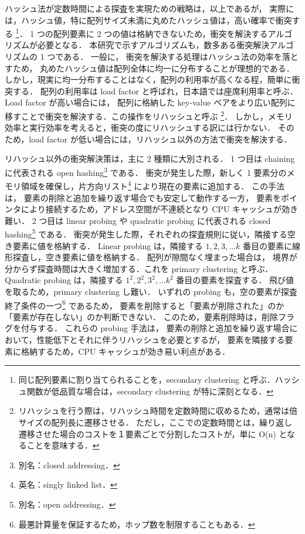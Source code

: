 ハッシュ法が定数時間による探査を実現ための戦略は，以上であるが，
実際には，ハッシュ値，特に配列サイズ未満に丸めたハッシュ値は，高い確率で衝突する
\footnote{
同じ配列要素に割り当てられることを，secondary clustering と呼ぶ．ハッシュ関数が低品質な場合は，secondary clustering が特に深刻となる．
}．
1 つの配列要素に 2 つの値は格納できないため，衝突を解決するアルゴリズムが必要となる．
本研究で示すアルゴリズムも，数多ある衝突解決アルゴリズムの 1 つである．
一般に，
衝突を解決する処理はハッシュ法の効率を落とすため，
丸めたハッシュ値は配列全体に均一に分布することが理想的である．
しかし，現実に均一分布することはなく，配列の利用率が高くなる程，簡単に衝突する．
配列の利用率は load factor と呼ばれ，日本語では座席利用率と呼ぶ．
Load factor が高い場合には，
配列に格納した key-value ペアをより広い配列に移すことで衝突を解決する．この操作をリハッシュと呼ぶ
\footnote{
リハッシュを行う際は，リハッシュ時間を定数時間に収めるため，通常は倍サイズの配列長に遷移させる．
ただし，ここでの定数時間とは，繰り返し遷移させた場合のコストを１要素ごとで分割したコストが，単に O(n) となることを意味する．
}．
しかし，メモリ効率と実行効率を考えると，衝突の度にリハッシュする訳には行かない．
そのため，load factor が低い場合には，リハッシュ以外の方法で衝突を解決する．

リハッシュ以外の衝突解決策は，主に 2 種類に大別される．
1 つ目は chaining に代表される open hashing\footnote{別名：closed addressing．} である．
衝突が発生した際，新しく 1 要素分のメモリ領域を確保し，片方向リスト\footnote{英名：singly linked list．} により現在の要素に追加する．
この手法は，
要素の削除と追加を繰り返す場合でも安定して動作する一方，
要素をポインタにより接続するため，アドレス空間が不連続となり CPU キャッシュが効き難い．
2 つ目は linear probing や quadratic probing に代表される closed hashing\footnote{別名：open addressing．} である．
衝突が発生した際，それぞれの探査規則に従い，隣接する空き要素に値を格納する．
Linear probing は，隣接する $1, 2, 3, ... k$ 番目の要素に線形探査し，空き要素に値を格納する．
配列が隙間なく埋まった場合は，
境界が分からず探査時間は大きく増加する．これを primary clustering と呼ぶ．
Quadratic probing は，隣接する $1^2, 2^2, 3^2, ... k^2$ 番目の要素を探査する．
飛び値を取るため，primary clustering し難い．
いずれの probing も，空の要素が探査終了条件の一つ\footnote{最悪計算量を保証するため，ホップ数を制限することもある．} であるため，
要素を削除すると「要素が削除された」のか「要素が存在しない」のか判断できない．
このため，要素削除時は，削除フラグを付与する．
これらの probing 手法は，
要素の削除と追加を繰り返す場合において，性能低下とそれに伴うリハッシュを必要とするが，
要素を隣接する要素に格納するため，CPU キャッシュが効き易い利点がある．

